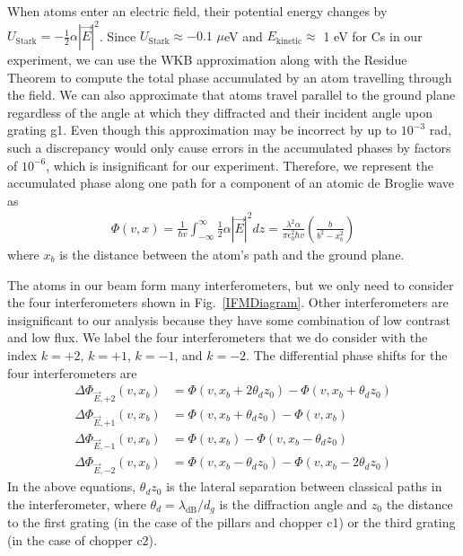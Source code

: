 \documentclass[twocolumn,pra,showpacs,superscriptaddress,longbibliography]{revtex4-1}   %
\newcommand{\figref}[1]{Fig.~\ref{#1}}
\begin{document}
When atoms enter an electric field, their potential energy changes by $U_{\mathrm{Stark}} = -\frac{1}{2}\alpha|\vec{E}|^2$.
Since $U_{\mathrm{Stark}} \approx -0.1$ $\mu$eV and $E_{\mathrm{kinetic}} \approx$ 1 eV for Cs in our experiment, we can use the WKB approximation along with the Residue Theorem to compute the total phase accumulated by an atom travelling through the field.
We can also approximate that atoms travel parallel to the ground plane regardless of the angle at which they diffracted and their incident angle upon grating g1. Even though this approximation may be incorrect by up to $10^{-3}$ rad, such a discrepancy would only cause errors in the accumulated phases by factors of $10^{-6}$, which is insignificant for our experiment.
Therefore, we represent the accumulated phase along one path for a component of an atomic de Broglie wave as
\begin{align}
	\Phi(v,x) = 
	\frac{1}{\hbar v} \int_{-\infty}^{\infty} \frac{1}{2} \alpha |\vec{E}|^2 dz =	
	\frac{\lambda^2 \alpha}{\pi \epsilon_0^2 \hbar v}
	\left( \frac{b}{b^2-x_b^2} \right)
	\label{accumPhasePillars}
\end{align}
where $x_b$ is the distance between the atom's path and the ground plane.

The atoms in our beam form many interferometers, but we only need to consider the four interferometers shown in \figref{IFMDiagram}. 
Other interferometers are insignificant to our analysis because they have some combination of low contrast and low flux.
We label the four interferometers that we do consider with the index $k=+2$, $k=+1$, $k=-1$, and $k=-2$. 
The differential phase shifts for the four interferometers are
\begin{align}
	\Delta\Phi_{\vec{E},+2}(v,x_b) &= \Phi(v, x_b+2\theta_d z_0) - \Phi(v, x_b+\theta_d z_0) \nonumber \\
	\Delta\Phi_{\vec{E},+1}(v,x_b) &= \Phi(v, x_b+\theta_d z_0) - \Phi(v, x_b) \nonumber \\
	\Delta\Phi_{\vec{E},-1}(v,x_b) &= \Phi(v, x_b) - \Phi(v, x_b-\theta_d z_0) \nonumber \\
	\Delta\Phi_{\vec{E},-2}(v,x_b) &= \Phi(v, x_b-\theta_d z_0) - \Phi(v, x_b-2\theta_d z_0)
	\label{deltaPhasePillars}
\end{align}
In the above equations, $\theta_d z_0$ is the lateral separation between classical paths in the interferometer, where $\theta_d = \lambda_{\mathrm{dB}} / d_g$ is the diffraction angle and $z_0$ the distance to 
the first grating (in the case of the pillars and chopper c1) or the third grating (in the case of chopper c2).
\end{document}
